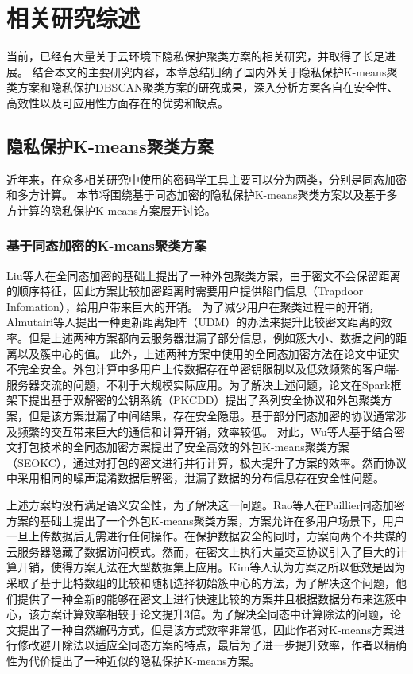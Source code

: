 \chapter{相关研究综述}
当前，已经有大量关于云环境下隐私保护聚类方案的相关研究，并取得了长足进展。
结合本文的主要研究内容，本章总结归纳了国内外关于隐私保护K-means聚类方案和隐私保护DBSCAN聚类方案的研究成果，深入分析方案各自在安全性、高效性以及可应用性方面存在的优势和缺点。

\section{隐私保护K-means聚类方案}
近年来，在众多相关研究中使用的密码学工具主要可以分为两类，分别是同态加密和多方计算。
本节将围绕基于同态加密的隐私保护K-means聚类方案以及基于多方计算的隐私保护K-means方案展开讨论。

\subsection{基于同态加密的K-means聚类方案}
Liu等人\cite{liu2014privacy}在全同态加密的基础上提出了一种外包聚类方案，由于密文不会保留距离的顺序特征，因此方案比较加密距离时需要用户提供陷门信息（Trapdoor Infomation），给用户带来巨大的开销。 
为了减少用户在聚类过程中的开销，Almutairi等人\cite{almutairi2017k}提出一种更新距离矩阵（UDM）的办法来提升比较密文距离的效率。但是上述两种方案都向云服务器泄漏了部分信息，例如簇大小、数据之间的距离以及簇中心的值。
此外，上述两种方案中使用的全同态加密方法在论文\cite{wang2015notes}中证实不完全安全。外包计算中多用户上传数据存在单密钥限制以及低效频繁的客户端-服务器交流的问题，不利于大规模实际应用。为了解决上述问题，论文\cite{rong2017privacy}在Spark框架下提出基于双解密的公钥系统（PKCDD）提出了系列安全协议和外包聚类方案，但是该方案泄漏了中间结果，存在安全隐患。基于部分同态加密的协议通常涉及频繁的交互带来巨大的通信和计算开销，效率较低。
对此，Wu等人\cite{wu2020secure}基于结合密文打包技术的全同态加密方案提出了安全高效的外包K-means聚类方案（SEOKC），通过对打包的密文进行并行计算，极大提升了方案的效率。然而协议中采用相同的噪声混淆数据后解密，泄漏了数据的分布信息存在安全性问题。

上述方案均没有满足语义安全性，为了解决这一问题。Rao等人\cite{rao2015privacy}在Paillier同态加密方案的基础上提出了一个外包K-means聚类方案，方案允许在多用户场景下，用户一旦上传数据后无需进行任何操作。在保护数据安全的同时，方案向两个不共谋的云服务器隐藏了数据访问模式。然而，在密文上执行大量交互协议引入了巨大的计算开销，使得方案无法在大型数据集上应用。Kim等人\cite{kim2018privacy}认为方案\cite{rao2015privacy}之所以低效是因为采取了基于比特数组的比较和随机选择初始簇中心的方法，为了解决这个问题，他们提供了一种全新的能够在密文上进行快速比较的方案并且根据数据分布来选簇中心，该方案计算效率相较于论文\cite{rao2015privacy}提升3倍。为了解决全同态中计算除法的问题，论文\cite{jaschke2019unsupervised}提出了一种自然编码方式，但是该方式效率非常低，因此作者对K-means方案进行修改避开除法以适应全同态方案的特点，最后为了进一步提升效率，作者以精确性为代价提出了一种近似的隐私保护K-means方案。


